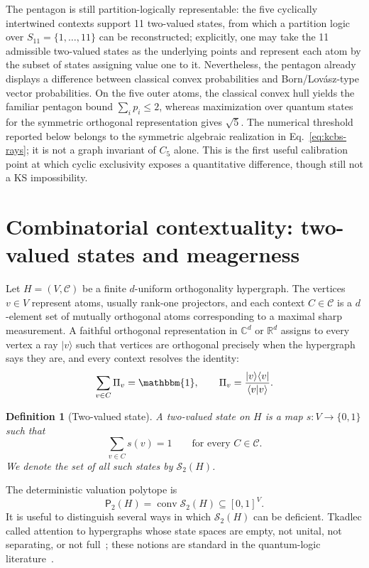\documentclass[aps,pra,twocolumn,superscriptaddress,nofootinbib]{revtex4-2}
\newtheorem{definition}{Definition}
\newcommand{\C}{\mathcal{C}}
\newcommand{\TVS}{\mathcal{S}_2}
\newcommand{\Ptwo}{\mathsf{P}_{2}}
\newcommand{\conv}{\operatorname{conv}}
\newcommand{\id}{\mathbbm{1}}
\newcommand{\reals}{\mathbb{R}}
\newcommand{\complex}{\mathbb{C}}
\begin{document}
The pentagon is still partition-logically representable: the five cyclically intertwined contexts support 11 two-valued states, from which a partition logic over $S_{11}=\{1,\ldots,11\}$ can be reconstructed; explicitly, one may take the 11 admissible two-valued states as the underlying points and represent each atom by the subset of states assigning value one to it.  Nevertheless, the pentagon already displays a difference between classical convex probabilities and Born/Lov\'asz-type vector probabilities.  On the five outer atoms, the classical convex hull yields the familiar pentagon bound $\sum_i p_i\le2$, whereas maximization over quantum states for the symmetric orthogonal representation gives $\sqrt5$.  The numerical threshold reported below belongs to the symmetric algebraic realization in Eq.~\eqref{eq:kcbs-rays}; it is not a graph invariant of \(C_5\) alone.  This is the first useful calibration point at which cyclic exclusivity exposes a quantitative difference, though still not a KS impossibility.

\section{Combinatorial contextuality: two-valued states and meagerness}

Let $H=(V,\C)$ be a finite $d$-uniform orthogonality hypergraph.  The vertices $v\in V$ represent atoms, usually rank-one projectors, and each context $C\in\C$ is a $d$-element set of mutually orthogonal atoms corresponding to a maximal sharp measurement.  A faithful orthogonal representation in $\complex^d$ or $\reals^d$ assigns to every vertex a ray $|v\rangle$ such that vertices are orthogonal precisely when the hypergraph says they are, and every context resolves the identity:
\begin{equation}
        \sum_{v\in C} \Pi_v = \id,
        \qquad \Pi_v=\frac{|v\rangle\langle v|}{\langle v|v\rangle}.
\end{equation}

\begin{definition}[Two-valued state]
A two-valued state on $H$ is a map $s:V\to\{0,1\}$ such that
\begin{equation}
        \sum_{v\in C}s(v)=1
        \qquad \text{for every } C\in\C.
        \label{eq:tvs}
\end{equation}
We denote the set of all such states by $\TVS(H)$.
\end{definition}

The deterministic valuation polytope is
\begin{equation}
        \Ptwo(H)=\conv\TVS(H)\subseteq[0,1]^V.
\end{equation}
It is useful to distinguish several ways in which $\TVS(H)$ can be deficient.  Tkadlec called attention to hypergraphs whose state spaces are empty, not unital, not separating, or not full~\cite{tkadlec-96}; these notions are standard in the quantum-logic literature~\cite{pulmannova-91,schaller-92,svozil-tkadlec}.
\end{document}
